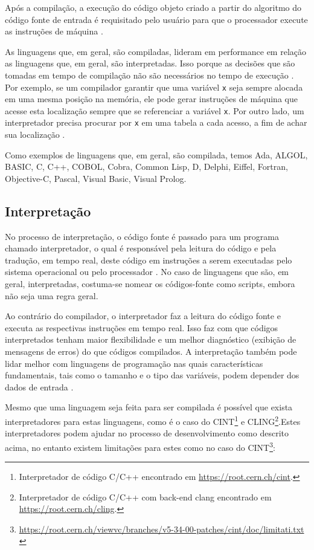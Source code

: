 Após a compilação, a execução do código objeto criado a partir do algoritmo do
 código fonte de entrada é requisitado pelo usuário para que o processador 
execute as instruções de máquina \cite[pág. 17]{ref6}.

As linguagens que, em geral, são compiladas, lideram em performance em relação
 as linguagens que, em geral, são interpretadas. Isso porque as decisões que são
 tomadas em tempo de compilação não são necessários no tempo de execução \cite[pág. 2]{ref3}.
Por exemplo, se um compilador garantir que uma variável \texttt{x} seja sempre alocada 
em uma  mesma posição na memória,  ele pode gerar instruções de máquina que 
acesse esta localização sempre que se referenciar a variável \texttt{x}. 
Por outro lado, um interpretador precisa procurar  por \texttt{x} em uma tabela a cada 
acesso, a fim de achar sua localização \cite[pág. 167]{ref2}.

Como exemplos de linguagens que, em geral, são compilada, temos Ada, ALGOL, 
BASIC, C, C++, COBOL, Cobra, Common Lisp, D, Delphi, Eiffel, Fortran, 
Objective-C, Pascal, Visual Basic, Visual Prolog.

\subsection{Interpretação}

No processo de interpretação, o código fonte é passado para um programa chamado
 interpretador, o qual é responsável pela leitura do código e pela tradução, 
em tempo real, deste código em instruções a serem executadas pelo sistema 
operacional ou  pelo processador \cite{ref2}. No caso de linguagens que são, em geral, 
interpretadas, costuma-se nomear os códigos-fonte como scripts, embora não seja 
uma regra geral.

Ao contrário do compilador, o interpretador faz a leitura do código fonte e 
executa  as respectivas instruções em tempo real. Isso faz com que  códigos 
interpretados tenham maior flexibilidade e um melhor diagnóstico (exibição de 
mensagens de erros) do que  códigos compilados. A interpretação também pode lidar 
melhor com linguagens de programação nas quais características fundamentais, 
tais como  o tamanho e  o tipo das variáveis, podem depender dos dados de 
entrada \cite[pág. 17]{ref6}.

Mesmo que uma linguagem seja feita para ser compilada é possível que exista 
interpretadores para estas linguagens, como é o caso do CINT\footnote{
Interpretador de código C/C++ encontrado em \url{https://root.cern.ch/cint}.}
 e CLING\footnote{Interpretador de código C/C++ com back-end clang encontrado em
  \url{https://root.cern.ch/cling}.}.Estes interpretadores podem ajudar no 
  processo de desenvolvimento como descrito acima, no entanto existem 
  limitações para estes como no caso do CINT\footnote{
  \url{https://root.cern.ch/viewvc/branches/v5-34-00-patches/cint/doc/limitati.txt }}:

